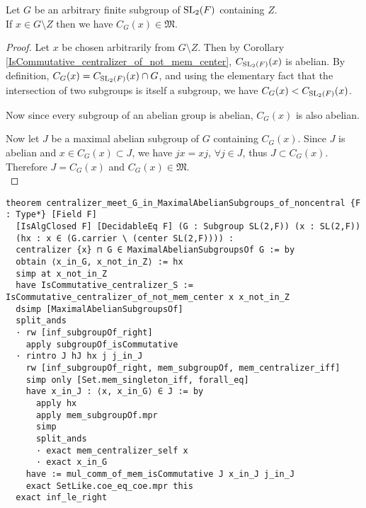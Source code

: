 \begin{theorem}
  \label{MaximalAbelianSubgroup.centralizer_meet_G_in_MaximalAbelianSubgroups_of_noncentral}
  \leanok 
  Let $G$ be an arbitrary finite subgroup of $\operatorname{SL}_2(F)$ containing $Z$. \\
If $x \in G \! \setminus \! Z$ then we have $C_G(x) \in \mathfrak{M}$. \vspace{3mm} \\
\end{theorem}
\begin{proof}
  \leanok
  Let $x$ be chosen arbitrarily from $G \! \setminus \! Z$. Then by Corollary \ref{IsCommutative_centralizer_of_not_mem_center}, $C_{\operatorname{SL}_2(F)}(x)$ is abelian. By definition, $C_G(x) = C_{\operatorname{SL}_2(F)}(x) \cap G$, 
  and using the elementary fact that the intersection of two subgroups is itself a subgroup, we have $C_G(x) < C_{\operatorname{SL}_2(F)}(x)$. 
  
  Now since every subgroup of an abelian group is abelian, $C_G(x)$ is also abelian.

  Now let $J$ be a maximal abelian subgroup of $G$ containing $C_G(x)$. Since $J$ is abelian and $x \in C_G(x) \subset J$, we have $jx=xj$, $\forall j \in J$, thus $J \subset C_G(x)$. Therefore $J=C_G(x)$ and $C_G(x) \in \mathfrak{M}$. \\
\end{proof}
\begin{footnotesize}
\begin{verbatim}
theorem centralizer_meet_G_in_MaximalAbelianSubgroups_of_noncentral {F : Type*} [Field F]
  [IsAlgClosed F] [DecidableEq F] (G : Subgroup SL(2,F)) (x : SL(2,F))
  (hx : x ∈ (G.carrier \ (center SL(2,F)))) :
  centralizer {x} ⊓ G ∈ MaximalAbelianSubgroupsOf G := by
  obtain ⟨x_in_G, x_not_in_Z⟩ := hx
  simp at x_not_in_Z
  have IsCommutative_centralizer_S := IsCommutative_centralizer_of_not_mem_center x x_not_in_Z
  dsimp [MaximalAbelianSubgroupsOf]
  split_ands
  · rw [inf_subgroupOf_right]
    apply subgroupOf_isCommutative
  · rintro J hJ hx j j_in_J
    rw [inf_subgroupOf_right, mem_subgroupOf, mem_centralizer_iff]
    simp only [Set.mem_singleton_iff, forall_eq]
    have x_in_J : ⟨x, x_in_G⟩ ∈ J := by
      apply hx
      apply mem_subgroupOf.mpr
      simp
      split_ands
      · exact mem_centralizer_self x
      · exact x_in_G
    have := mul_comm_of_mem_isCommutative J x_in_J j_in_J
    exact SetLike.coe_eq_coe.mpr this
  exact inf_le_right
\end{verbatim}
\end{footnotesize}

